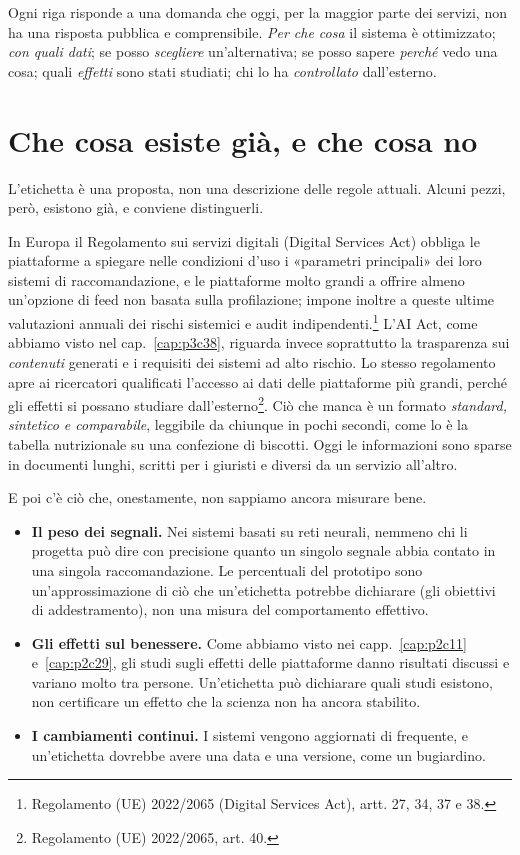 Ogni riga risponde a una domanda che oggi, per la maggior parte dei servizi, non ha una risposta pubblica e comprensibile. \textit{Per che cosa} il sistema è ottimizzato; \textit{con quali dati}; se posso \textit{scegliere} un'alternativa; se posso sapere \textit{perché} vedo una cosa; quali \textit{effetti} sono stati studiati; chi lo ha \textit{controllato} dall'esterno.

\section{Che cosa esiste già, e che cosa no}
\label{sec:p4c31-cosa-esiste}

L'etichetta è una proposta, non una descrizione delle regole attuali. Alcuni pezzi, però, esistono già, e conviene distinguerli.

In Europa il Regolamento sui servizi digitali (Digital Services Act) obbliga le piattaforme a spiegare nelle condizioni d'uso i «parametri principali» dei loro sistemi di raccomandazione, e le piattaforme molto grandi a offrire almeno un'opzione di feed non basata sulla profilazione; impone inoltre a queste ultime valutazioni annuali dei rischi sistemici e audit indipendenti.\footnote{Regolamento (UE) 2022/2065 (Digital Services Act), artt. 27, 34, 37 e 38.} L'AI Act, come abbiamo visto nel cap.~\ref{cap:p3c38}, riguarda invece soprattutto la trasparenza sui \textit{contenuti} generati e i requisiti dei sistemi ad alto rischio. Lo stesso regolamento apre ai ricercatori qualificati l'accesso ai dati delle piattaforme più grandi, perché gli effetti si possano studiare dall'esterno\footnote{Regolamento (UE) 2022/2065, art. 40.}. Ciò che manca è un formato \textit{standard, sintetico e comparabile}, leggibile da chiunque in pochi secondi, come lo è la tabella nutrizionale su una confezione di biscotti. Oggi le informazioni sono sparse in documenti lunghi, scritti per i giuristi e diversi da un servizio all'altro.

E poi c'è ciò che, onestamente, non sappiamo ancora misurare bene.

\begin{itemize}
	\item \textbf{Il peso dei segnali.} Nei sistemi basati su reti neurali, nemmeno chi li progetta può dire con precisione quanto un singolo segnale abbia contato in una singola raccomandazione. Le percentuali del prototipo sono un'approssimazione di ciò che un'etichetta potrebbe dichiarare (gli obiettivi di addestramento), non una misura del comportamento effettivo.
	\item \textbf{Gli effetti sul benessere.} Come abbiamo visto nei capp.~\ref{cap:p2c11} e~\ref{cap:p2c29}, gli studi sugli effetti delle piattaforme danno risultati discussi e variano molto tra persone. Un'etichetta può dichiarare quali studi esistono, non certificare un effetto che la scienza non ha ancora stabilito.
	\item \textbf{I cambiamenti continui.} I sistemi vengono aggiornati di frequente, e un'etichetta dovrebbe avere una data e una versione, come un bugiardino.
\end{itemize}

